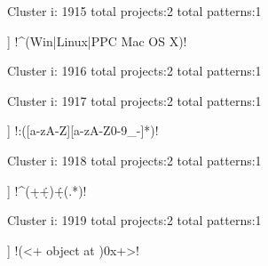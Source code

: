 Cluster i: 1915
total projects:2
total patterns:1
\begin{multicols}{1}
\begin{description}[noitemsep,topsep=0pt]
\item [[2] ] \cverb!^(Win|Linux|PPC Mac OS X)!
\end{description}
\end{multicols}







Cluster i: 1916
total projects:2
total patterns:1
\begin{multicols}{1}
\begin{description}[noitemsep,topsep=0pt]
\item [[2] ] \cverb!^(}|struct\s+\w+);\s*$!
\end{description}
\end{multicols}







Cluster i: 1917
total projects:2
total patterns:1
\begin{multicols}{1}
\begin{description}[noitemsep,topsep=0pt]
\item [[2] ] \cverb!:([a-zA-Z][a-zA-Z0-9_-]*)!
\end{description}
\end{multicols}







Cluster i: 1918
total projects:2
total patterns:1
\begin{multicols}{1}
\begin{description}[noitemsep,topsep=0pt]
\item [[2] ] \cverb!^(\d+\.\d+)\.\d+(.*)!
\end{description}
\end{multicols}







Cluster i: 1919
total projects:2
total patterns:1
\begin{multicols}{1}
\begin{description}[noitemsep,topsep=0pt]
\item [[2] ] \cverb!(<\w+ object at )0x\w+>!
\end{description}
\end{multicols}








